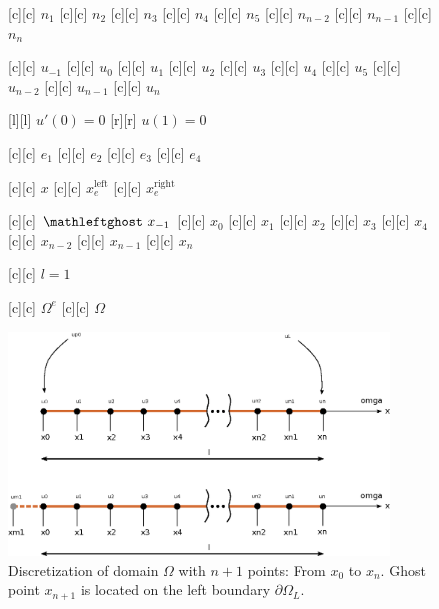 \begin{figure}[ht]
	\centering
	\footnotesize

	[c] {$n_1$}
	[c] {$n_2$}
	[c] {$n_3$}
	[c] {$n_4$}
	[c] {$n_5$}
	[c] {$n_{n-2}$}
	[c] {$n_{n-1}$}
	[c] {$n_{n}$}

	[c] {$u_{-1}$}
	[c] {$u_0$}
	[c] {$u_1$}
	[c] {$u_2$}
	[c] {$u_3$}
	[c] {$u_4$}
	[c] {$u_5$}
	[c] {$u_{n-2}$}
	[c] {$u_{n-1}$}
	[c] {$u_{n}$}

	[l] {$u'(0)=0$}
	[r] {$u(1)=0$}

	[c] {$e_1$}
	[c] {$e_2$}
	[c] {$e_3$}
	[c] {$e_4$}

	[c] {$x$}
	[c] {$x_{e}^{\text{left}}$}
	[c] {$x_{e}^{\text{right}}$}

	[c] {$\mathleftghost \ x_{-1}$}
	[c] {$x_0$}
	[c] {$x_1$}
	[c] {$x_2$}
	[c] {$x_3$}
	[c] {$x_4$}
	[c] {$x_{n-2}$}
	[c] {$x_{n-1}$}
	[c] {$x_{n}$}

	[c] {$l=1$}

	[c] {$\Omega^{e}$}
	[c] {$\Omega$}

	\includegraphics[width=0.9\textwidth]{discretizeGhostLeft.eps}

	\caption{Discretization of domain $\Omega$ with $n+1$ points: From $x_{0}$ to $x_{n}$.
		Ghost point $x_{n+1}$ is located on the left boundary $\partial\Omega_{L}$.}
	\label{\LABEL}
\end{figure}